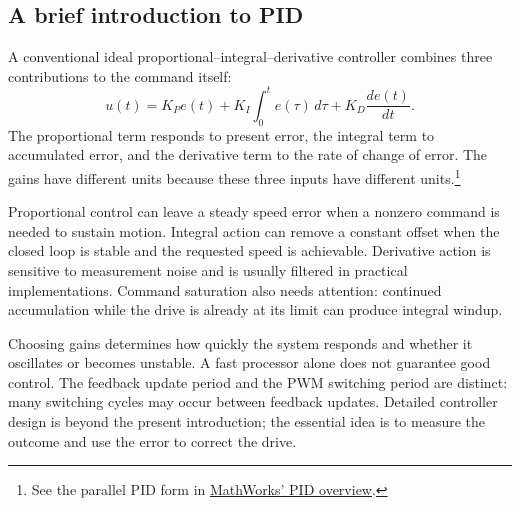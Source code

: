 \subsection{A brief introduction to PID}
A conventional ideal proportional--integral--derivative controller combines
three contributions to the command itself:
\begin{equation}
 u(t)=K_P e(t)+K_I\int_0^t e(\tau)\,d\tau
       +K_D\frac{de(t)}{dt}.
 \label{eq:l08-pid}
\end{equation}
The proportional term responds to present error, the integral term to
accumulated error, and the derivative term to the rate of change of error.
The gains have different units because these three inputs have different
units.\footnote{See the parallel PID form in
\href{https://www.mathworks.com/help/control/ug/proportional-integral-derivative-pid-controllers.html}{MathWorks' PID overview}.}

Proportional control can leave a steady speed error when a nonzero command
is needed to sustain motion. Integral action can remove a constant offset
when the closed loop is stable and the requested speed is achievable.
Derivative action is sensitive to measurement noise and is usually filtered
in practical implementations. Command saturation also needs attention:
continued accumulation while the drive is already at its limit can produce
integral windup.

Choosing gains determines how quickly the system responds and whether it
oscillates or becomes unstable. A fast processor alone does not guarantee
good control. The feedback update period and the PWM switching period are
distinct: many switching cycles may occur between feedback updates. Detailed
controller design is beyond the present introduction; the essential idea is
to measure the outcome and use the error to correct the drive.

\clearpage
